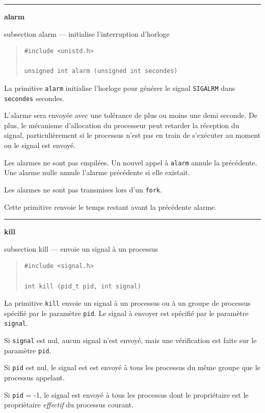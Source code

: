 \documentclass [twoside] {report}
\newcommand {\primitive} [1]
    {
	\phantomsection
	{\large \textbf {#1}}
	\addcontentsline {toc} {subsection} {#1}
    }
\newcommand {\separation}
    {
	\vspace {5mm}
	\nopagebreak
	\hrule
    }
\begin{document}
\separation
\primitive {alarm} --- initialise l'interruption d'horloge

\begin {quote}
\begin {verbatim}
#include <unistd.h>

unsigned int alarm (unsigned int secondes)
\end{verbatim}
\end {quote}

La primitive \texttt {alarm} initialise l'horloge pour
générer le signal \texttt {SIGALRM} dans \texttt {secondes}
secondes.

L'alarme sera envoyée avec une tolérance de plus ou
moins une demi seconde. De plus, le mécanisme
d'allocation du processeur peut retarder la
réception du signal, particulièrement si le
processus n'est pas en train de s'exécuter au
moment ou le signal est envoyé.

Les alarmes ne sont pas empilées. Un nouvel appel
à \texttt {alarm} annule la précédente. Une alarme nulle
annule l'alarme précédente si elle existait.

Les alarmes ne sont pas transmises lors d'un
\texttt {fork}.

Cette primitive renvoie le temps restant avant la
précédente alarme.




\separation
\primitive {kill} --- envoie un signal à un processus
    \label {kill}

\begin {quote}
\begin {verbatim}
#include <signal.h>

int kill (pid_t pid, int signal)
\end{verbatim}
\end {quote}

La primitive \texttt {kill} envoie un signal à un
processus ou à un groupe de processus spécifié par
le paramètre \texttt {pid}. Le signal à envoyer est
spécifié par le paramètre \texttt {signal}.

Si \texttt {signal} est nul, aucun signal n'est envoyé,
mais une vérification est faite
sur le paramètre \texttt {pid}.

Si \texttt {pid} est nul, le signal est est envoyé à tous
les processus du même groupe que le processus
appelant.

Si \texttt {pid} = -1, le signal est envoyé à tous les
processus dont le propriétaire est le propriétaire
\textit {effectif} du processus courant.
\end{document}
